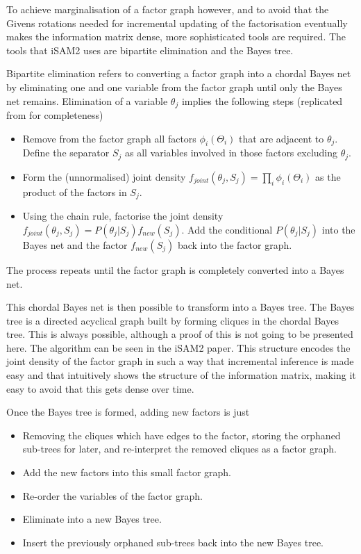 To achieve marginalisation of a factor graph however, and to avoid that the Givens rotations needed for incremental updating of the factorisation eventually makes the information matrix dense, more sophisticated tools are required. The tools that iSAM2 uses are bipartite elimination\cite{BipartElim} and the Bayes tree\cite{BayesTree}. 

Bipartite elimination refers to converting a factor graph into a chordal Bayes net by eliminating one and one variable from the factor graph until only the Bayes net remains. Elimination of a variable $\theta_j$ implies the following steps (replicated from \cite{iSAM2} for completeness)

\begin{itemize}
    \item Remove from the factor graph all factors $\phi_i(\Theta_i)$ that are adjacent to $\theta_j$. Define the separator $S_j$ as all variables involved in those factors excluding $\theta_j$.
    \item Form the (unnormalised) joint density $f_{joint}(\theta_j,S_j) = \prod_i\phi_i(\Theta_i)$ as the product of the factors in $S_j$.
    \item Using the chain rule, factorise the joint density $f_{joint}(\theta_j, S_j) = P(\theta_j| S_j)f_{new}(S_j)$. Add the conditional $P(\theta_j|S_j)$ into the Bayes net and the factor $f_{new}(S_j)$ back into the factor graph.
\end{itemize}

The process repeats until the factor graph is completely converted into a Bayes net.

This chordal Bayes net is then possible to transform into a Bayes tree. The Bayes tree is a directed acyclical graph built by forming cliques in the chordal Bayes tree. This is always possible, although a proof of this is not going to be presented here. The algorithm can be seen in the iSAM2 paper\cite{iSAM2}. This structure encodes the joint density of the factor graph in such a way that incremental inference is made easy and that intuitively shows the structure of the information matrix, making it easy to avoid that this gets dense over time.

Once the Bayes tree is formed, adding new factors is just 

\begin{itemize}
    \item Removing the cliques which have edges to the factor, storing the orphaned sub-trees for later, and re-interpret the removed cliques as a factor graph.
    \item Add the new factors into this small factor graph.
    \item Re-order the variables of the factor graph.
    \item Eliminate into a new Bayes tree.
    \item Insert the previously orphaned sub-trees back into the new Bayes tree.
\end{itemize}

